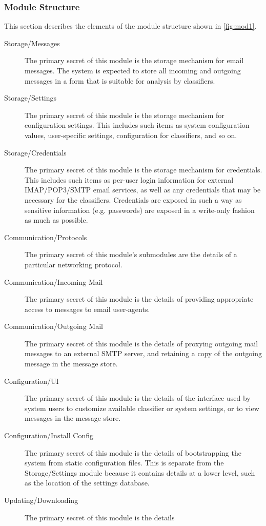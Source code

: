 \documentclass[letterpaper,11pt]{article}
\begin{document}
\subsubsection{Module Structure}
\label{sec:modules}
This section describes the elements of the module structure shown in
\autoref{fig:mod1}.
\begin{description}
\item[Storage/Messages] The primary secret of this module is the storage
  mechanism for email messages.  The system is expected to store all incoming
  and outgoing messages in a form that is suitable for analysis by
  classifiers.
\item[Storage/Settings] The primary secret of this module is the storage
  mechanism for configuration settings.  This includes such items as system
  configuration values, user-specific settings, configuration for classifiers,
  and so on.
\item[Storage/Credentials] The primary secret of this module is the storage
  mechanism for credentials.  This includes such items as per-user login
  information for external IMAP/POP3/SMTP email services, as well as any
  credentials that may be necessary for the classifiers.  Credentials are
  exposed in such a way as sensitive information (e.g. passwords) are exposed
  in a write-only fashion as much as possible.
\item[Communication/Protocols] The primary secret of this module's submodules
  are the details of a particular networking protocol.  
\item[Communication/Incoming Mail] The primary secret of this module is the
  details of providing appropriate access to messages to email user-agents.
\item[Communication/Outgoing Mail] The primary secret of this module is the
  details of proxying outgoing mail messages to an external SMTP server, and
  retaining a copy of the outgoing message in the message store.
\item[Configuration/UI] The primary secret of this module is the details of
  the interface used by system users to customize available classifier or
  system settings, or to view messages in the message store.
\item[Configuration/Install Config] The primary secret of this module is the
  details of bootstrapping the system from static configuration files.  This
  is separate from the Storage/Settings module because it contains details at
  a lower level, such as the location of the settings database.
\item[Updating/Downloading] The primary secret of this module is the details

\end{description}
\end{document}
